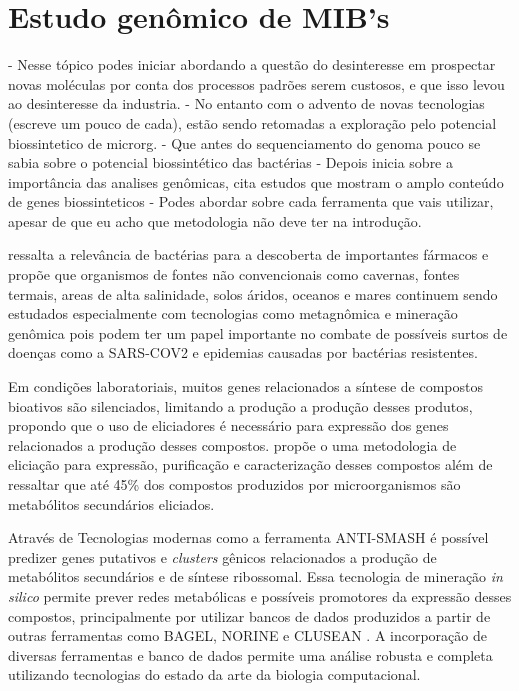 \section{Estudo genômico de MIB's}
- Nesse tópico podes iniciar abordando a questão do desinteresse em prospectar novas moléculas por conta dos processos padrões serem custosos, e que isso levou ao desinteresse da industria. 
- No  entanto com o advento de novas tecnologias (escreve um pouco de cada), estão sendo retomadas a exploração pelo potencial biossintetico de microrg.
- Que antes do sequenciamento do genoma pouco se sabia sobre o potencial biossintético das bactérias
- Depois inicia sobre a importância das analises genômicas, cita estudos que mostram o amplo conteúdo de genes biossinteticos
- Podes abordar sobre cada ferramenta que vais utilizar, apesar de que eu acho que metodologia não deve ter na introdução.


 ressalta a relevância de bactérias para a descoberta de importantes
fármacos e propõe que organismos de fontes não convencionais como cavernas, fontes termais,
areas de alta salinidade, solos áridos, oceanos e mares continuem sendo estudados especialmente
com tecnologias como metagnômica e mineração genômica pois podem ter um papel importante no 
combate de possíveis surtos de doenças como a SARS-COV2 e epidemias causadas por bactérias resistentes.

Em condições laboratoriais, muitos genes relacionados a síntese de
compostos bioativos são silenciados, limitando a produção a produção desses produtos, propondo
que o uso de eliciadores é necessário para expressão dos genes relacionados a produção desses 
compostos\cite{rutledge2015}.  propõe o uma metodologia de eliciação para expressão, purificação
e caracterização desses compostos além de ressaltar que até 45\% dos compostos produzidos por
microorganismos são metabólitos secundários eliciados.

Através de Tecnologias modernas como a ferramenta ANTI-SMASH \cite{antismash} é possível predizer
genes putativos e \textit{clusters} gênicos relacionados a produção de metabólitos secundários
e de síntese ribossomal. Essa tecnologia de mineração \textit{in silico} permite prever redes
metabólicas e possíveis promotores da expressão desses compostos, principalmente por utilizar
bancos de dados produzidos a partir de outras ferramentas como BAGEL, NORINE e CLUSEAN \cite{bagel2,bagel3,norine,clusean}.
A incorporação de diversas ferramentas e banco de dados permite uma análise robusta 
e completa utilizando tecnologias do estado da arte da biologia computacional.
